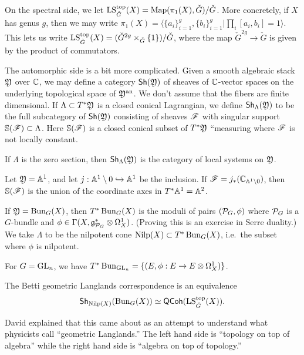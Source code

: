 \documentclass{article}
\begin{document}
On the spectral side, we let $\LS_{\check{G}}^\toprm(X) = \Map(\pi_1(X), \check{G}) / \check{G}$.
More concretely, if $X$ has genus $g$, then we may write $\pi_1(X) = \langle \{ a_i \}_{i=1}^g, \{ b_i \}_{i=1}^g | \prod_i [a_i, b_i] = 1 \rangle$.
This lets us write $\LS_{\check{G}}^\toprm(X) = (\check{G}^{2g} \times_{\check{G}} \{ 1 \}) / \check{G}$, where the map $\check{G}^{2g} \to \check{G}$ is given by the product of commutators.

The automorphic side is a bit more complicated.
Given a smooth algebraic stack $\Yfr$ over $\CC$, we may define a category $\Sh(\Yfr)$ of sheaves of $\CC$-vector spaces on the underlying topological space of $\Yfr^\mathrm{an}$.
We don't assume that the fibers are finite dimensional.
If $\Lambda \subset T^* \Yfr$ is a closed conical Lagrangian, we define $\Sh_\Lambda(\Yfr)$ to be the full subcategory of $\Sh(\Yfr)$ consisting of sheaves $\Fsc$ with singular support $\SS(\Fsc) \subset \Lambda$.
Here $\SS(\Fsc)$ is a closed conical subset of $T^* \Yfr$ ``measuring where $\Fsc$ is not locally constant.

\begin{ex}
  If $\Lambda$ is the zero section, then $\Sh_\Lambda(\Yfr)$ is the category of local systems on $\Yfr$.
\end{ex}

\begin{ex}
  Let $\Yfr = \AA^1$, and let $j: \AA^1 \setminus 0 \hookrightarrow \AA^1$ be the inclusion.
  If $\Fsc = j_*(\CC_{\AA^1 \setminus 0})$, then $\SS(\Fsc)$ is the union of the coordinate axes in $T^* \AA^1 = \AA^2$.
\end{ex}

If $\Yfr = \Bun_G(X)$, then $T^*\Bun_G(X)$ is the moduli of pairs $(\Pc_G, \phi)$ where $\Pc_G$ is a $G$-bundle and $\phi \in \Gamma(X, \gfr^*_{\Pc_G} \otimes \Omega^1_X)$.
(Proving this is an exercise in Serre duality.)
We take $\Lambda$ to be the nilpotent cone $\Nilp(X) \subset T^*\Bun_G(X)$, i.e.\ the subset where $\phi$ is nilpotent.

\begin{ex}
  For $G = \GL_n$, we have $T^* \Bun_{\GL_n} = \{ (E, \phi: E \to E \otimes \Omega^1_X) \}$.
\end{ex}

The Betti geometric Langlands correspondence is an equivalence
\[
  \Sh_{\Nilp(X)}(\Bun_G(X)) \simeq \QCoh(\LS_{\check{G}}^\toprm(X)).
\]

\begin{rmk}
  David explained that this came about as an attempt to understand what physicists call ``geometric Langlands.''
  The left hand side is ``topology on top of algebra'' while the right hand side is ``algebra on top of topology.''
\end{rmk}
\end{document}
